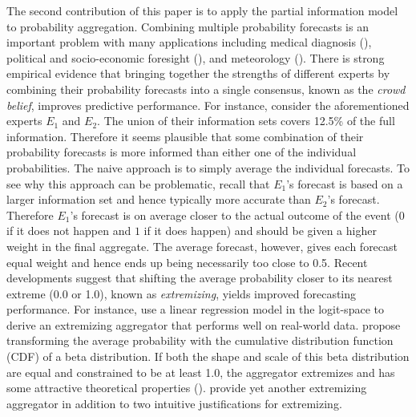 \documentclass[11pt,twoside]{article}
\theoremstyle{definition}
\theoremstyle{definition}
\begin{document}
The second contribution of this paper is to apply the partial information model to probability aggregation. Combining multiple probability forecasts is an important problem with many applications including medical diagnosis (\citet{wilson1998prediction, pepe2003statistical}), political and socio-economic foresight (\citet{tetlock2005expert}), and meteorology (\citet{sanders1963subjective, vislocky1995improved, baars2005performance}). There is strong empirical evidence that bringing together the strengths of different experts by combining their probability forecasts into a single consensus, known as the \textit{crowd belief},  improves predictive performance. For instance, consider the aforementioned experts $E_1$ and $E_2$. The union of their information sets covers 12.5\% of the full information. Therefore it seems plausible that some combination of their probability forecasts is more informed than either one of the individual probabilities. The naive approach is to simply average the individual forecasts. To see why this approach can be problematic, recall that $E_1$'s forecast is based on a larger information set and hence typically more accurate than $E_2$'s forecast. Therefore $E_1$'s forecast is on average closer to the actual outcome of the event ($0$ if it does not happen and $1$ if it does happen) and should be given a higher weight in the final aggregate.  The average forecast, however, gives each forecast equal weight and hence ends up being necessarily too close to 0.5. Recent developments suggest that shifting the average probability closer to its nearest extreme (0.0 or 1.0), known as \textit{extremizing}, yields improved forecasting performance. For instance, \citet{satopaa} use a linear regression model in the logit-space to derive an extremizing aggregator that performs well on real-world data. \citet{Ranjan08} propose transforming the average probability with the cumulative distribution function (CDF) of a beta distribution. If both the shape and scale of this beta distribution are equal and constrained to be at least 1.0,  the aggregator extremizes and has some attractive theoretical properties (\cite{Wallsten2001}).  \citet{Baron} provide yet another extremizing aggregator in addition to two intuitive justifications for extremizing.
\end{document}
